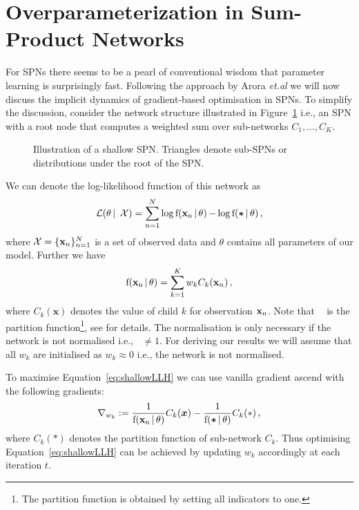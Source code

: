 \documentclass{article}
\DeclareMathOperator*{\f}{f(\xn \,|\, \theta)}
\DeclareMathOperator*{\fz}{f(\bm \ast \,|\, \theta)}
\begin{document}
\section{Overparameterization in Sum-Product Networks} \label{sec:main}
For SPNs there seems to be a pearl of conventional wisdom that parameter learning is surprisingly fast.
Following the approach by Arora {\it et.al} \cite{Arora2018} we will now discuss the implicit dynamics of gradient-based optimisation in SPNs.
To simplify the discussion, consider the network structure illustrated in Figure~\ref{fig:shallow} i.e., an SPN with a root node that computes a weighted sum over sub-networks $C_1, \dots, C_K$.

\begin{figure}[t]
  \centering
  
  \caption{Illustration of a shallow SPN. Triangles denote sub-SPNs or distributions under the root of the SPN.}
  \label{fig:shallow}
\end{figure}

We can denote the log-likelihood function of this network as
\begin{equation} \label{eq:shallowLLH}
\mathcal{L}(\theta\, | \, \mathcal{X}) = \sum_{n=1}^N \log \f - \log \fz \, ,
\end{equation}
where $\mathcal{X} = \{\mathbf{x}_{n}\}_{n=1}^N$ is a set of observed data and $\theta$ contains all parameters of our model. Further we have
\[
\f = \sum_{k=1}^K w_k C_k(\xn) \, ,
\]
where $C_k(\bm x)$ denotes the value of child $k$ for observation $\mathbf{x}_{n}$.
Note that $\fz$ is the partition function\footnote{The partition function is obtained by setting all indicators to one.}, see \cite{Poon2011a} for details. The normalisation is only necessary if the network is not normalised i.e.,  $\fz \not = 1$.
For deriving our results we will assume that all $w_k$ are initialised as $w_k \approx 0$ i.e., the network is not normalised.

To maximise Equation~\ref{eq:shallowLLH} we can use vanilla gradient ascend with the following gradients:
\begin{equation}
  \nabla_{w_k} := \frac{1}{\f}C_k(\bm x) - \frac{1}{\fz}C_k(\ast) \, ,
\end{equation}
where $C_k(\ast)$ denotes the partition function of sub-network $C_k$.
Thus optimising Equation~\ref{eq:shallowLLH} can be achieved by updating $w_k$ accordingly at each iteration $t$.
\end{document}
